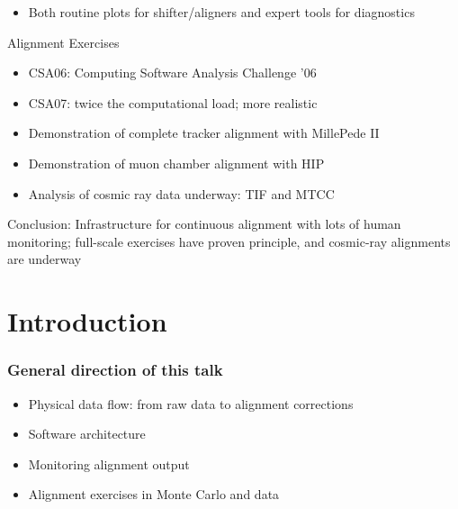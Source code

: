 \documentclass[compress]{beamer}
\begin{document}
\begin{notes}
\begin{itemize}
    \item \tiny Both routine plots for shifter/aligners and expert tools for diagnostics
\end{itemize}
\item \tiny Alignment Exercises
\begin{itemize}
    \item \tiny CSA06: Computing Software Analysis Challenge '06
    \item \tiny CSA07: twice the computational load; more realistic
    \item \tiny Demonstration of complete tracker alignment with MillePede II
    \item \tiny Demonstration of muon chamber alignment with HIP
    \item \tiny Analysis of cosmic ray data underway: TIF and MTCC
\end{itemize}
\item \tiny Conclusion: Infrastructure for continuous alignment with lots of human
monitoring; full-scale exercises have proven principle, and cosmic-ray
alignments are underway
\end{notes}

\section*{Introduction}

\begin{frame}
\frametitle{General direction of this talk}
\begin{itemize}\setlength{\itemsep}{0.75 cm}
  \item Physical data flow: from raw data to alignment corrections
  \item Software architecture
  \item Monitoring alignment output
  \item Alignment exercises in Monte Carlo and data
\end{itemize}
\end{frame}
\end{document}
